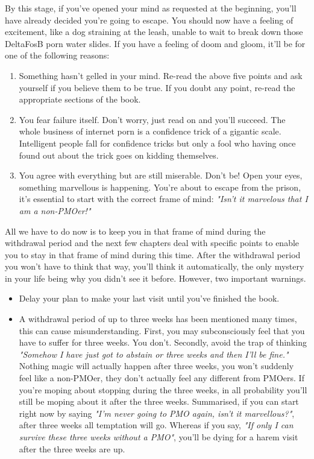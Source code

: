\documentclass[easypeasy]{subfiles}
\begin{document}
By this stage, if you've opened your mind as requested at the beginning, you'll have already decided you're going to escape. You should now have a feeling of excitement, like a dog straining at the leash, unable to wait to break down those DeltaFosB porn water slides. If you have a feeling of doom and gloom, it'll be for one of the following reasons:
\begin{enumerate}
  \item Something hasn't gelled in your mind. Re-read the above five points and ask yourself if you believe them to be true. If you doubt any point, re-read the appropriate sections of the book.

  \item You fear failure itself. Don't worry, just read on and you'll succeed. The whole business of internet porn is a confidence trick of a gigantic scale. Intelligent people fall for confidence tricks but only a fool who having once found out about the trick goes on kidding themselves.

  \item You agree with everything but are still miserable. Don't be! Open your eyes, something marvellous is happening. You're about to escape from the prison, it's essential to start with the correct frame of mind: \textit{"Isn't it marvelous that I am a non-PMOer!"}
  \end{enumerate}
All we have to do now is to keep you in that frame of mind during the withdrawal period and the next few chapters deal with specific points to enable you to stay in that frame of mind during this time. After the withdrawal period you won't have to think that way, you'll think it automatically, the only mystery in your life being why you didn't see it before. However, two important warnings.

  \begin{itemize}
  \item Delay your plan to make your last visit until you've finished the book.
  \item A withdrawal period of up to three weeks has been mentioned many times, this can cause misunderstanding. First, you may subconsciously feel that you have to suffer for three weeks. You don't. Secondly, avoid the trap of thinking \textit{"Somehow I have just got to abstain or three weeks and then I'll be fine."} Nothing magic will actually happen after three weeks, you won't suddenly feel like a non-PMOer, they don't actually feel any different from PMOers. If you're moping about stopping during the three weeks, in all probability you'll still be moping about it after the three weeks. Summarised, if you can start right now by saying \textit{"I'm never going to PMO again, isn't it marvellous?"}, after three weeks all temptation will go. Whereas if you say, \textit{"If only I can survive these three weeks without a PMO"}, you'll be dying for a harem visit after the three weeks are up.
  \end{itemize}
\end{document}
